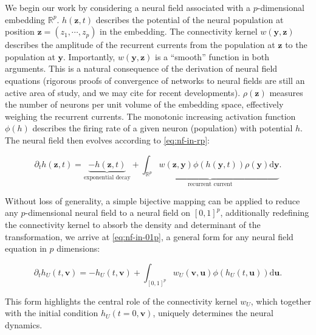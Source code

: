 \documentclass[10pt,letterpaper]{article}
\def\R{\mathbb R}
\def\Rp{\R^p}
\renewcommand{\vec}[1]{\boldsymbol{#1}}
\begin{document}
We begin our work by considering a neural field associated with a $p$-dimensional embedding $\Rp$. $h(\vec z, t)$ describes the potential of the neural population at position $\vec z=(z_1,\cdots,z_p)$ in the embedding. The connectivity kernel $w(\vec y, \vec z)$ describes the amplitude of the recurrent currents from the population at $\vec z$ to the population at $\vec y$. Importantly, $w(\vec y, \vec z)$ is a ``smooth'' function in both arguments. This is a natural consequence of the derivation of neural field equations (rigorous proofs of convergence of networks to neural fields are still an active area of study, and we may cite \cite{CheDua19,AGATHENERINE202286} for recent developments).
$\rho(\vec z)$ measures the number of neurons per unit volume of the embedding space, effectively weighing the recurrent currents. The monotonic increasing activation function $\phi(h)$ describes the firing rate of a given neuron (population) with potential $h$. The neural field then evolves according to \autoref{eq:nf-in-rp}:  

\begin{equation} \label{eq:nf-in-rp}
\partial_t h(\vec z, t) = \underbrace{-h(\vec z, t)}_\text{exponential decay} + \underbrace{\int_{\mathbb{R}^p} w(\vec z, \vec y) \phi(h(\vec y, t)) \rho(\vec y) \mathrm d \vec y}_\text{recurrent current}.
\end{equation}

Without loss of generality, a simple bijective mapping can be applied to reduce any $p$-dimensional neural field to a neural field on $[0,1]^p$, additionally redefining the connectivity kernel to absorb the density and determinant of the transformation, we arrive at \autoref{eq:nf-in-01p}, a general form for any neural field equation in $p$ dimensions:


\begin{equation} \label{eq:nf-in-01p}
\partial_t h_U(t, \vec v) = -h_U(t, \vec v) + \int_{[0,1]^p} w_U(\vec v, \vec u) \phi(h_U(t, \vec u)) \mathrm d \vec u.
\end{equation}

This form highlights the central role of the connectivity kernel $w_U$, which together with the initial condition $h_U(t=0, \vec v)$, uniquely determines the neural dynamics.
\end{document}
